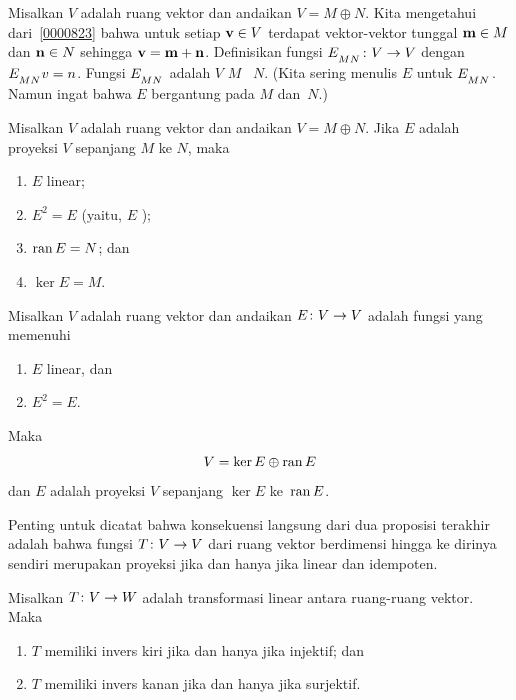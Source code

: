 \begin{defn} Misalkan $V$ adalah ruang vektor dan andaikan $V = M \oplus N$. Kita mengetahui
dari~\ref{0000823} bahwa untuk setiap $\mathbf{v} \in V$ terdapat vektor-vektor tunggal $\mathbf{m} \in M$
dan $\mathbf{n} \in N$ sehingga $\mathbf{v} = \mathbf{m} + \mathbf{n}$. Definisikan fungsi $E_{{}_{\scriptstyle{MN}}}\colon V \rightarrow V$ dengan $E_{{}_{\scriptstyle{MN}}}v = n$.
Fungsi $E_{{}_{\scriptstyle{MN}}}$ adalah
 $V$  $M$ ~$N$. (Kita sering menulis $E$ untuk $E_{{}_{\scriptstyle{MN}}}$. Namun ingat bahwa
$E$ bergantung pada $M$ dan~$N$.)
\end{defn}

\begin{prop} Misalkan $V$ adalah ruang vektor dan andaikan $V = M \oplus N$. Jika $E$ adalah
proyeksi $V$ sepanjang $M$ ke $N$, maka
 \begin{enumerate}[label=\rm{(\alph*)}]
  \item $E$ linear;
  \item $E^2 = E$ \quad (yaitu, $E$ );
  \item $\operatorname{ran} E = N$; dan
  \item $\ker E = M$.
 \end{enumerate}
\end{prop}

\begin{prop} Misalkan $V$ adalah ruang vektor dan andaikan $E\colon V \rightarrow V$ adalah fungsi yang
memenuhi
 \begin{enumerate}[label=\rm{(\alph*)}]
  \item $E$ linear, dan
  \item $E^2 = E$.
\end{enumerate}
Maka
 \[V = \ker E \oplus \operatorname{ran} E\]
dan $E$ adalah proyeksi $V$ sepanjang $\ker E$ ke~$\operatorname{ran} E$.
\end{prop}

Penting untuk dicatat bahwa konsekuensi langsung dari dua proposisi terakhir adalah bahwa
fungsi $T\colon V \rightarrow V$ dari ruang vektor berdimensi hingga ke dirinya sendiri merupakan
proyeksi jika dan hanya jika linear dan idempoten.






\begin{prop} Misalkan $T\colon V \rightarrow W$ adalah transformasi linear antara ruang-ruang vektor. Maka
  \begin{enumerate}[label=\rm{(\alph*)}]
    \item $T$ memiliki invers kiri jika dan hanya jika injektif; dan
    \item $T$ memiliki invers kanan jika dan hanya jika surjektif.
  \end{enumerate}
\end{prop}












